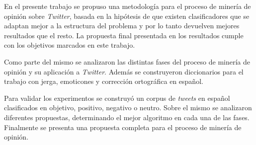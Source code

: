 \begin{conclusions}
En el presente trabajo se propuso una metodología para 
el proceso de minería de opinión sobre \emph{Twitter}, basada en la hipótesis 
de que existen clasificadores que se adaptan mejor a la estructura del
problema y por lo tanto devuelven mejores resultados que el resto.
La propuesta final presentada en los resultados cumple con 
los objetivos marcados en este trabajo.

Como parte del mismo se analizaron las distintas fases del 
proceso de minería de opinión y su aplicación a \emph{Twitter}.
Además se construyeron diccionarios para el trabajo con jerga, emoticones
y corrección ortográfica en español.

Para validar los experimentos se construyó un corpus de \emph{tweets} en español
clasificados en objetivo, positivo, negativo o neutro. 
Sobre el mismo se analizaron diferentes propuestas,
determinando el mejor algoritmo en cada una de las fases. Finalmente
se presenta una propuesta completa para el proceso de minería de opinión.

\end{conclusions}

